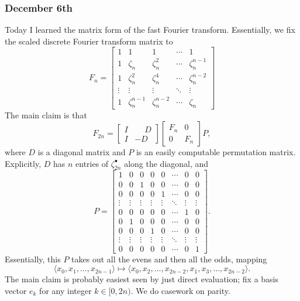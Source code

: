 \subsubsection{December 6th}
Today I learned the matrix form of the fast Fourier transform. Essentially, we fix the scaled discrete Fourier transform matrix to
\[F_n=\begin{bmatrix}
    1 & 1 & 1 & \cdots & 1 \\
    1 & \zeta_n & \zeta_n^2 & \cdots & \zeta_n^{n-1} \\
    1 & \zeta_n^2 & \zeta_n^4 & \cdots & \zeta_n^{n-2} \\
    \vdots & \vdots & \vdots & \ddots & \vdots \\
    1 & \zeta_n^{n-1} & \zeta_n^{n-2} & \cdots & \zeta_n
\end{bmatrix}\]
The main claim is that
\[F_{2n}=\begin{bmatrix}
    I & \phantom-D \\
    I & -D
\end{bmatrix}\begin{bmatrix}
    F_n & 0 \\
    0 & F_n
\end{bmatrix}P,\]
where $D$ is a diagonal matrix and $P$ is an easily computable permutation matrix. Explicitly, $D$ has $n$ entries of $\zeta_{2n}^\bullet$ along the diagonal, and
\[P=\begin{bmatrix}
    1 & 0 & 0 & 0 & 0 & \cdots & 0 & 0 \\
    0 & 0 & 1 & 0 & 0 & \cdots & 0 & 0 \\
    0 & 0 & 0 & 0 & 1 & \cdots & 0 & 0 \\
    \vdots & \vdots & \vdots & \vdots & \vdots & \ddots & \vdots & \vdots \\
    0 & 0 & 0 & 0 & 0 & \cdots & 1 & 0 \\
    0 & 1 & 0 & 0 & 0 & \cdots & 0 & 0 \\
    0 & 0 & 0 & 1 & 0 & \cdots & 0 & 0 \\
    \vdots & \vdots & \vdots & \vdots & \vdots & \ddots & \vdots & \vdots \\
    0 & 0 & 0 & 0 & 0 & \cdots & 0 & 1
\end{bmatrix}.\]
Essentially, this $P$ takes out all the evens and then all the odds, mapping 
\[\langle x_0,x_1,\ldots,x_{2n-1}\rangle\mapsto\langle x_0,x_2,\ldots,x_{2n-2},x_1,x_3,\ldots,x_{2n-2}\rangle.\]
The main claim is probably easiest seen by just direct evaluation; fix a basis vector $e_k$ for any integer $k\in[0,2n).$ We do casework on parity.
